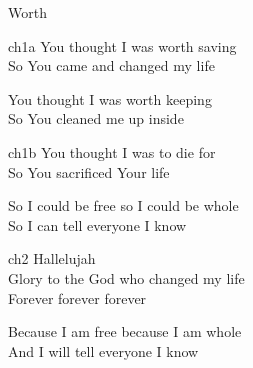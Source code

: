 \begin{song}{Worth}

    \begin{songframe}{ch1a}
        You thought I was worth saving \\
        So You came and changed my life 

        You thought I was worth keeping \\
        So You cleaned me up inside
    \end{songframe}

    \begin{songframe}{ch1b}
        You thought I was to die for \\
        So You sacrificed Your life

        So I could be free so I could be whole \\
        So I can tell everyone I know
    \end{songframe}

    \begin{songframe}{ch2}
        Hallelujah \\
        Glory to the God who changed my life \\
        Forever forever forever

        Because I am free because I am whole \\
        And I will tell everyone I know
    \end{songframe}



\end{song}
\endinput
